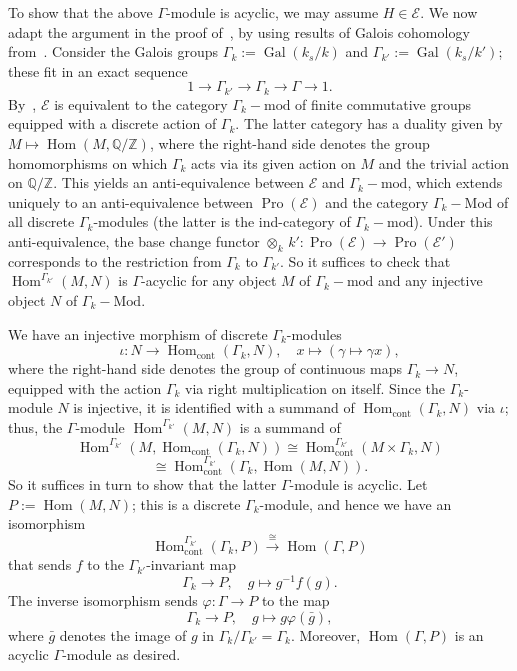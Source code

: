 \documentclass[11pt]{article}
\theoremstyle{definition}
\numberwithin{equation}{section}
\newcommand\bQ{{\mathbb Q}}
\newcommand\bZ{{\mathbb Z}}
\newcommand\cE{{\mathcal E}}
\DeclareMathOperator{\cont}{cont}
\DeclareMathOperator{\Gal}{Gal}
\DeclareMathOperator{\Hom}{Hom}
\DeclareMathOperator{\Pro}{Pro}
\renewcommand\mod{\mathrm{mod}}
\newcommand\Mod{\mathrm{Mod}}
\theoremstyle{remark}
\begin{document}
To show that the above $\Gamma$-module is acyclic, we may assume $H \in \cE$. We now adapt the argument in the proof of~\cite[Lem.~3.10]{Br17b}, by using results of Galois cohomology from~\cite[Chap.~II]{Se97}. Consider the Galois groups $\Gamma_k := \Gal(k_s/k)$ and $\Gamma_{k'} := \Gal(k_s/k')$; these fit in an exact sequence
\[
1 \longrightarrow \Gamma_{k'} \longrightarrow
\Gamma_k \longrightarrow \Gamma
\longrightarrow 1.
\]
By~\cite[II.5.1.7]{DG}, $\cE$ is equivalent to the category $\Gamma_k-\mod$ of finite commutative groups equipped with a discrete action of $\Gamma_k$. The latter category has a duality given by $M \mapsto \Hom(M,\bQ/\bZ)$, where the right-hand side denotes the group homomorphisms on which $\Gamma_k$ acts via its given action on $M$ and the trivial action on $\bQ/\bZ$. This yields an anti-equivalence between $\cE$ and $\Gamma_k-\mod$, which extends uniquely to an anti-equivalence between $\Pro(\cE)$ and the category $\Gamma_k-\Mod$ of all discrete $\Gamma_k$-modules (the latter is the ind-category of $\Gamma_k-\mod$). Under this anti-equivalence, the base change functor $\otimes_k \, k' : \Pro(\cE) \to \Pro(\cE')$ corresponds to the restriction from $\Gamma_k$ to $\Gamma_{k'}$. So it suffices to check that $\Hom^{\Gamma_{k'}}(M,N)$ is $\Gamma$-acyclic for any object $M$ of $\Gamma_k-\mod$ and any injective object $N$ of $\Gamma_k-\Mod$.

We have an injective morphism of discrete $\Gamma_k$-modules
\[
\iota : N \longrightarrow
\Hom_{\cont}(\Gamma_k,N), \quad x \longmapsto (\gamma \longmapsto \gamma x),
\]
where the right-hand side denotes the group of continuous maps $\Gamma_k \to N$, equipped with the action $\Gamma_k$ via right multiplication on itself. Since the $\Gamma_k$-module $N$ is injective, it is identified with a summand of $\Hom_{\cont}(\Gamma_k,N)$ via $\iota$; thus, the $\Gamma$-module $\Hom^{\Gamma_{k'}}(M,N)$ is a summand of
\[
\Hom^{\Gamma_{k'}} (M, \Hom_{\cont}(\Gamma_k,N)) \cong
\Hom^{\Gamma_{k'}}_{\cont} (M \times \Gamma_k, N)
\]
\[
\cong \Hom^{\Gamma_{k'}}_{\cont} (\Gamma_k, \Hom(M,N)).
\]
So it suffices in turn to show that the latter $\Gamma$-module is acyclic. Let $P := \Hom(M,N)$; this is a discrete $\Gamma_k$-module, and hence we have an isomorphism
\[
\Hom^{\Gamma_{k'}}_{\cont}(\Gamma_k,P)
\stackrel{\cong}{\longrightarrow} \Hom(\Gamma,P)
\]
that sends $f$ to the $\Gamma_{k'}$-invariant map
\[
\Gamma_k \longrightarrow P, \quad g \longmapsto g^{-1} f(g).
\]
The inverse isomorphism sends $\varphi : \Gamma \to P$ to the map
\[
\Gamma_k \longrightarrow P, \quad g \longmapsto g \varphi(\bar{g}),
\]
where $\bar{g}$ denotes the image of $g$ in $\Gamma_k/\Gamma_{k'} = \Gamma_k$. Moreover, $\Hom(\Gamma,P)$ is an acyclic $\Gamma$-module as desired.
\end{document}
